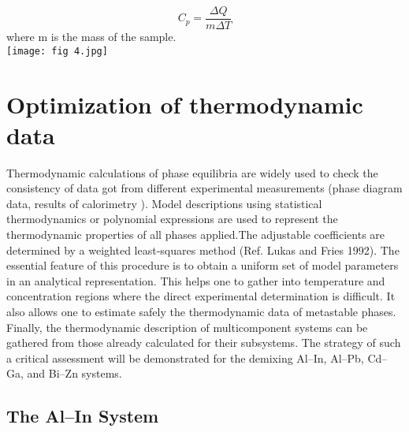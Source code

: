 \documentclass[12pt]{article}
\newcommand*{\1}{\hspace{1pt}}
\begin{document}
        \begin{equation}
            C _p = \frac{\Delta Q}{m\Delta T} 
        \end{equation}   
    where m is the mass of the sample.\\

    \begin{adjustbox}{center,caption={Calorimetrically determined slope of the enthalpy of mixing of liquid Cd–In alloy at
        628 K (after Predel and Oehme 1977).Ref.\cite{s5} },label={somelabel},nofloat=figure,vspace=\bigskipamount}
        \texttt{[image: fig 4.jpg]}
    \end{adjustbox}


    \section{ Optimization of thermodynamic data}  

    Thermodynamic calculations of phase equilibria are widely used to check the consistency
    of data got from different experimental measurements (phase diagram data, results of
    calorimetry ). Model descriptions using statistical
    thermodynamics or polynomial expressions are used to represent the thermodynamic
    properties of all phases applied.The adjustable coefficients are determined by a weighted
    least-squares method (Ref.\cite{s6} Lukas and Fries 1992). The essential feature of this procedure
    is to obtain a uniform set of model parameters in an analytical representation. This helps
    one to gather into temperature and concentration regions where the direct experimental
    determination is difficult. It also allows one to estimate safely the thermodynamic data of
    metastable phases. Finally, the thermodynamic description of multicomponent systems can
    be gathered from those already calculated for their subsystems. The strategy of such a
    critical assessment will be demonstrated for the demixing Al–In, Al–Pb, Cd–Ga, and Bi–Zn
    systems. \\


    \subsection{ The Al–In System }
\end{document}
